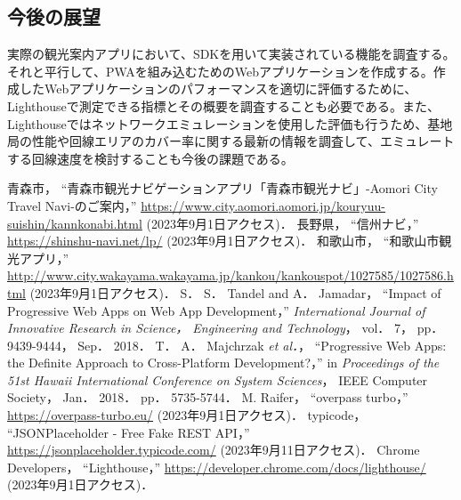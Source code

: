 \begin{multicols*}{2}
\section{今後の展望}
実際の観光案内アプリにおいて、SDKを用いて実装されている機能を調査する。それと平行して、PWAを組み込むためのWebアプリケーションを作成する。作成したWebアプリケーションのパフォーマンスを適切に評価するために、Lighthouseで測定できる指標とその概要を調査することも必要である。また、Lighthouseではネットワークエミュレーションを使用した評価も行うため、基地局の性能や回線エリアのカバー率に関する最新の情報を調査して、エミュレートする回線速度を検討することも今後の課題である。

\begin{thebibliography}{9}
 青森市， ``青森市観光ナビゲーションアプリ「青森市観光ナビ」-Aomori City Travel Navi-のご案内，'' \url{https://www.city.aomori.aomori.jp/kouryuu-suishin/kannkonabi.html} (2023年9月1日アクセス)．
 長野県， ``信州ナビ，'' \url{https://shinshu-navi.net/lp/} (2023年9月1日アクセス)．
 和歌山市， ``和歌山市観光アプリ，'' \url{http://www.city.wakayama.wakayama.jp/kankou/kankouspot/1027585/1027586.html} (2023年9月1日アクセス)．
 S． S． Tandel and A． Jamadar， ``Impact of Progressive Web Apps on Web App Development，'' \textit{International Journal of Innovative Research in Science， Engineering and Technology}， vol． 7， pp． 9439-9444， Sep． 2018．
 T． A． Majchrzak \textit{et al．}， ``Progressive Web Apps: the Definite Approach to Cross-Platform Development?，'' in \textit{Proceedings of the 51st Hawaii International Conference on System Sciences}， IEEE Computer Society， Jan． 2018． pp． 5735-5744． 
 M. Raifer， ``overpass turbo，'' \url{https://overpass-turbo.eu/} (2023年9月1日アクセス)．
 typicode， ``JSONPlaceholder - Free Fake REST API，'' \url{https://jsonplaceholder.typicode.com/} (2023年9月11日アクセス)．
 Chrome Developers， ``Lighthouse，'' \url{https://developer.chrome.com/docs/lighthouse/} (2023年9月1日アクセス)．
\end{thebibliography}

\end{multicols*}

